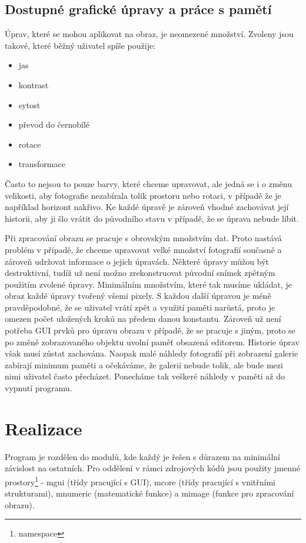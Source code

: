 \documentclass[11pt,twoside,a4paper]{book}
\begin{document}
\section{Dostupné grafické úpravy a práce s pamětí}
\noindent
Úprav, které se mohou aplikovat na obraz, je neomezené množství. Zvoleny jsou takové, které běžný uživatel spíše použije:
\begin{itemize}
\item jas
\item kontrast
\item sytost
\item převod do černobílé
\item rotace
\item transformace
\end{itemize}

\indent
Často to nejsou to pouze barvy, které chceme upravovat, ale jedná se i o změnu velikosti, aby fotografie nezabírala tolik prostoru nebo rotaci, v případě že je například horizont nakřivo. Ke každé úpravě je zároveň vhodné zachovávat její historii, aby ji šlo vrátit do původního stavu v případě, že se úprava nebude líbit.

\indent
Při zpracování obrazu se pracuje s obrovským množstvím dat. Proto nastává problém v případě, že chceme upravovat velké množství fotografií současně a zároveň udržovat informace o jejich úpravách. Některé úpravy můžou být destruktivní, tudíž už není možno zrekonstruovat původní snímek zpětným použitím zvolené úpravy. Minimálním množstvím, které tak musíme ukládat, je obraz každé úpravy tvořený všemi pixely. S každou další úpravou je méně pravděpodobné, že se uživatel vrátí zpět a využití paměti narůstá, proto je omezen počet uložených kroků na předem danou konstantu. Zároveň už není potřeba GUI prvků pro úpravu obrazu v případě, že se pracuje s jiným, proto se po změně zobrazovaného objektu uvolní paměť obsazená editorem. Historie úprav však musí zůstat zachována. Naopak malé náhledy fotografií při zobrazení galerie zabírají minimum paměti a očekáváme, že galerií nebude tolik, ale bude mezi nimi uživatel často přecházet. Ponecháme tak veškeré náhledy v paměti až do vypnutí programu.

\chapter{Realizace}
\noindent
Program je rozdělen do modulů, kde každý je řešen s důrazem na minimální závislost na ostatních. Pro oddělení v rámci zdrojových kódů jsou použity jmenné prostory\footnote{namespace} - mgui (třídy pracující s GUI), mcore (třídy pracující s vnitřními strukturami), mnumeric (matematické funkce) a mimage (funkce pro zpracování obrazu).
\end{document}
